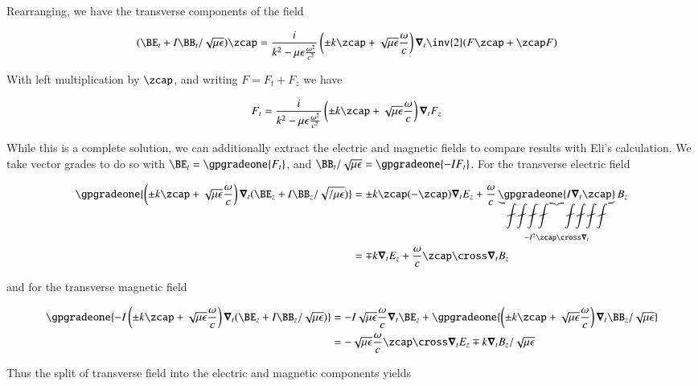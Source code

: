 Rearranging, we have the transverse components of the field

\begin{align}\label{eqn:transverseField:blah10}
(\BE_t + I \BB_t/\sqrt{\mu\epsilon}) \zcap &=
\frac{i}{k^2 - \mu\epsilon\frac{\omega^2}{c^2}} \left( \pm k \zcap + \sqrt{\mu\epsilon}\frac{\omega}{c}\right) \spacegrad_t \inv{2}( F \zcap + \zcap F) 
\end{align}

With left multiplication by $\zcap$, and writing $F = F_t + F_z$ we have

\begin{align}\label{eqn:transverseField:transverseBoth}
F_t &= \frac{i}{k^2 - \mu\epsilon\frac{\omega^2}{c^2}} \left( \pm k \zcap + \sqrt{\mu\epsilon}\frac{\omega}{c}\right) \spacegrad_t F_z
\end{align}

While this is a complete solution, we can additionally extract the electric and magnetic fields to compare results with Eli's calculation.  We take 
vector grades to do so with $\BE_t = \gpgradeone{F_t}$, and $\BB_t/\sqrt{\mu\epsilon} = \gpgradeone{-I F_t}$.   For the transverse electric field

\begin{align*}
\gpgradeone{ \left( \pm k \zcap + \sqrt{\mu\epsilon}\frac{\omega}{c}\right) \spacegrad_t (\BE_z + I \BB_z/\sqrt{/\mu\epsilon}) } 
&=
\pm k \zcap (-\zcap) \spacegrad_t E_z + \frac{\omega}{c} \underbrace{\gpgradeone{I \spacegrad_t \zcap}}_{-I^2 \zcap \cross \spacegrad_t } B_z \\
&=
\mp k \spacegrad_t E_z + \frac{\omega}{c} \zcap \cross \spacegrad_t B_z \\
\end{align*}

and for the transverse magnetic field

\begin{align*}
\gpgradeone{ -I \left( \pm k \zcap + \sqrt{\mu\epsilon}\frac{\omega}{c}\right) \spacegrad_t (\BE_z + I \BB_z/\sqrt{\mu\epsilon}) } 
&=
-I \sqrt{\mu\epsilon}\frac{\omega}{c} \spacegrad_t \BE_z
+\gpgradeone{ \left( \pm k \zcap + \sqrt{\mu\epsilon}\frac{\omega}{c}\right) \spacegrad_t \BB_z/\sqrt{\mu\epsilon} }  \\
&=
- \sqrt{\mu\epsilon}\frac{\omega}{c} \zcap \cross \spacegrad_t E_z
\mp k \spacegrad_t B_z/\sqrt{\mu\epsilon} \\
\end{align*}

Thus the split of transverse field into the electric and magnetic components yields

